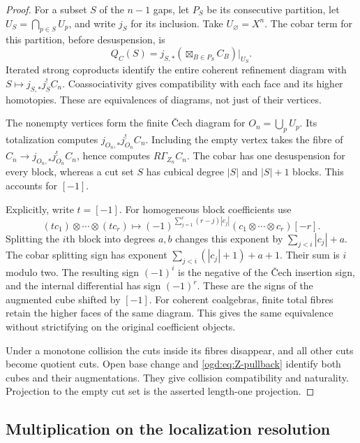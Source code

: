 \begin{proof}
For a subset $S$ of the $n-1$ gaps, let $P_S$ be its consecutive partition,
let $U_S=\bigcap_{p\in S}U_p$, and write $j_S$ for its inclusion.
Take $U_\varnothing=X^n$. The cobar term for this partition, before
desuspension, is
\[
 Q_C(S)=j_{S,*}
       \left(\mathop{\boxtimes}_{B\in P_S}C_B\right)|_{U_S}.
\]
Iterated strong coproducts identify the entire coherent refinement diagram
with $S\mapsto j_{S,*}j_S^!C_n$. Coassociativity gives compatibility with
each face and its higher homotopies. These are equivalences of diagrams,
not just of their vertices.

The nonempty vertices form the finite \v Cech diagram for
$O_n=\bigcup_pU_p$. Its totalization computes $j_{O_n,*}j_{O_n}^!C_n$.
Including the empty vertex takes the fibre of
$C_n\to j_{O_n,*}j_{O_n}^!C_n$, hence computes $R\Gamma_{Z_n}C_n$.
The cobar has one desuspension for every block, whereas a cut set $S$
has cubical degree $|S|$ and $|S|+1$ blocks. This accounts for $[-1]$.

Explicitly, write $t=[-1]$. For homogeneous block coefficients use
\begin{equation}\label{ogd:eq:cut-suspension}
 (tc_1)\otimes\cdots\otimes(tc_r)\longmapsto
 (-1)^{\sum_{j=1}^r(r-j)|c_j|}
 (c_1\otimes\cdots\otimes c_r)[-r].
\end{equation}
Splitting the $i$th block into degrees $a,b$ changes this exponent by
$\sum_{j<i}|c_j|+a$. The cobar splitting sign has exponent
$\sum_{j<i}(|c_j|+1)+a+1$. Their sum is $i$ modulo two.
The resulting sign $(-1)^i$ is the negative of the \v Cech insertion
sign, and the internal differential has sign $(-1)^r$.
These are the signs of the augmented cube shifted by $[-1]$.
For coherent coalgebras, finite total fibres retain the higher faces of
the same diagram. This gives the same equivalence without strictifying
on the original coefficient objects.

Under a monotone collision the cuts inside its fibres disappear, and
all other cuts become quotient cuts. Open base change and
\eqref{ogd:eq:Z-pullback} identify both cubes and their augmentations.
They give collision compatibility and naturality. Projection to the
empty cut set is the asserted length-one projection.
\end{proof}

\subsection{Multiplication on the localization resolution}

